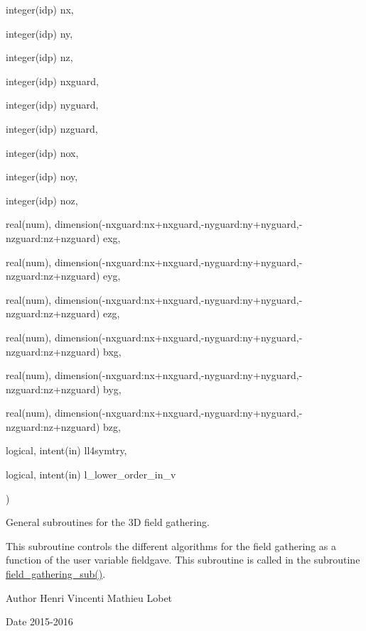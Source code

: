 {\begin{DoxyParamCaption}
\item[{integer(idp)}]{nx, }
\item[{integer(idp)}]{ny, }
\item[{integer(idp)}]{nz, }
\item[{integer(idp)}]{nxguard, }
\item[{integer(idp)}]{nyguard, }
\item[{integer(idp)}]{nzguard, }
\item[{integer(idp)}]{nox, }
\item[{integer(idp)}]{noy, }
\item[{integer(idp)}]{noz, }
\item[{real(num), dimension(-\/nxguard\+:nx+nxguard,-\/nyguard\+:ny+nyguard,-\/nzguard\+:nz+nzguard)}]{exg, }
\item[{real(num), dimension(-\/nxguard\+:nx+nxguard,-\/nyguard\+:ny+nyguard,-\/nzguard\+:nz+nzguard)}]{eyg, }
\item[{real(num), dimension(-\/nxguard\+:nx+nxguard,-\/nyguard\+:ny+nyguard,-\/nzguard\+:nz+nzguard)}]{ezg, }
\item[{real(num), dimension(-\/nxguard\+:nx+nxguard,-\/nyguard\+:ny+nyguard,-\/nzguard\+:nz+nzguard)}]{bxg, }
\item[{real(num), dimension(-\/nxguard\+:nx+nxguard,-\/nyguard\+:ny+nyguard,-\/nzguard\+:nz+nzguard)}]{byg, }
\item[{real(num), dimension(-\/nxguard\+:nx+nxguard,-\/nyguard\+:ny+nyguard,-\/nzguard\+:nz+nzguard)}]{bzg, }
\item[{logical, intent(in)}]{ll4symtry, }
\item[{logical, intent(in)}]{l\+\_\+lower\+\_\+order\+\_\+in\+\_\+v}
\end{DoxyParamCaption}
)}\hypertarget{field__gathering_8_f90_ae97b65ed28e18c6c648fbcd18c5e1339}{}\label{field__gathering_8_f90_ae97b65ed28e18c6c648fbcd18c5e1339}


General subroutines for the 3D field gathering. 

This subroutine controls the different algorithms for the field gathering as a function of the user variable fieldgave. This subroutine is called in the subroutine \hyperlink{field__gathering_8_f90_a3048fd8eb5e48d87fa67d382d260b22f}{field\+\_\+gathering\+\_\+sub()}. \begin{DoxyAuthor}{Author}
Henri Vincenti Mathieu Lobet 
\end{DoxyAuthor}
\begin{DoxyDate}{Date}
2015-\/2016 
\end{DoxyDate}
